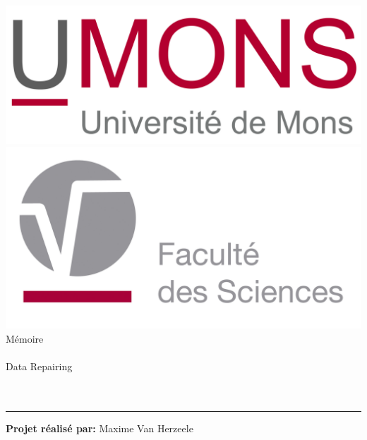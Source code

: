 \documentclass[letterpaper, 12pt]{report}
\begin{document}
\begin{titlepage}

\noindent


\begin{center}
\includegraphics[scale=0.2]{umonslogo}\\
\vspace*{0.7cm}
\includegraphics[scale=0.32]{fs-logo}\\
\vspace*{2.5cm}
\titlefont Mémoire\\~\\{\LARGE  Data Repairing\\}~\\~\\{\large} \par
\end{center}
\vspace*{3.5cm}
\hfill
\begin{minipage}{0.18\linewidth}
  \begin{flushright}
   \rule{0.5pt}{75pt}
  \end{flushright}
\end{minipage}
\begin{minipage}{0.8\linewidth}
\begin{flushleft}
\textsf{\textbf{Projet réalisé par:}} Maxime Van Herzeele\\

\end{flushleft}
\end{minipage}
\end{titlepage}
\end{document}
